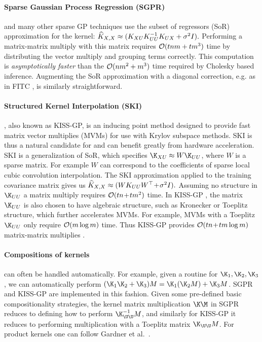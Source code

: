 \paragraph{Sparse Gaussian Process Regression (SGPR)} \cite{titsias2009variational} and many other sparse GP techniques \cite{quinonero2005unifying,snelson2006sparse,hensman2013gaussian} use the subset of regressors (SoR) approximation for the kernel:
$
  \widehat{K}_{X,X} \approx (K_{XU}K_{UU}^{-1}K_{UX} + \sigma^{2}I).
$
Performing a matrix-matrix multiply with this matrix requires $\bigo{tnm + tm^{3}}$ time by distributing the vector multiply and grouping terms correctly.
This computation is \emph{asymptotically faster} than the $\bigo{nm^{2} + m^{3}}$ time required by Cholesky based inference. Augmenting the SoR approximation with a diagonal correction, e.g. as in FITC \cite{snelson2006sparse}, is similarly straightforward.

\paragraph{Structured Kernel Interpolation (SKI)} \cite{wilson2015kernel}, also known as KISS-GP, is an inducing point method designed to provide fast matrix vector multiplies (MVMs) for use with Krylov subspace methods. SKI is thus a natural candidate for \mmacro{} and can benefit greatly from hardware acceleration.
SKI is a generalization of SoR, which specifies $\K_{XU} \approx W\K_{UU}$, where $W$ is a sparse matrix. For example $W$ can correspond to the coefficients of sparse local cubic convolution interpolation.
The SKI approximation applied to the training covariance matrix gives us
$
\widehat{K}_{X,X} \approx (WK_{UU}W^{\top} \! + \! \sigma^{2}I).
$
Assuming no structure in $\K_{UU}$ a matrix multiply requires $\bigo{tn \! + \! tm^{2}}$ time. In KISS-GP \citep{wilson2015kernel,wilson2015thoughts}, the matrix $\K_{UU}$ is also chosen to have algebraic structure, such as Kronecker or Toeplitz structure, which further accelerates MVMs. For example, MVMs with a Toeplitz $\K_{UU}$ only require $\bigo{m \log m}$ time. Thus KISS-GP
provides $\bigo{tn \! + \! tm \log m}$ matrix-matrix multiplies \cite{wilson2015kernel}.

\paragraph{Compositions of kernels} can often be handled automatically.
For example, given a \mmacro{} routine for $\K_{1},\K_{2},\K_{3}$, we can automatically perform $(\K_{1}\K_{2}+\K_{3})M = \K_{1}(\K_{2}M) + \K_{3}M$.
SGPR and KISS-GP are implemented in this fashion. Given some pre-defined basic compositionality strategies, the kernel matrix multiplication $\K\M$ in SGPR reduces to defining how to perform $\K_{\U\U}^{-1}M$, and similarly for KISS-GP it reduces to performing multiplication with a Toeplitz matrix $\K_{\U\U}M$. For product kernels one can follow Gardner et al.~\cite{gardner2018product}.
